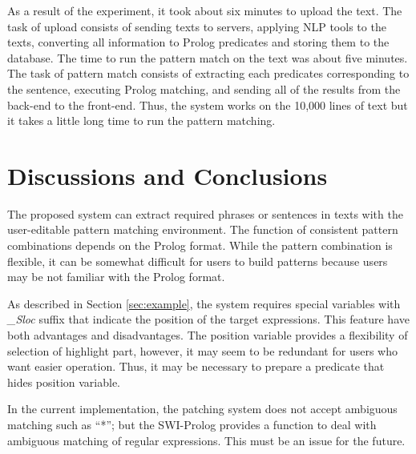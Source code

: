 \documentclass[conference]{IEEEtran}
\begin{document}
As a result of the experiment, it took about six minutes to upload the text.
The task of upload consists of sending texts to servers, applying NLP tools
to the texts, converting all information to Prolog predicates and storing them
to the database. 
The time to run the pattern match on the text was about five minutes.
The task of pattern match consists of extracting each predicates corresponding to the sentence,
executing Prolog matching, and sending all of the results from the back-end to the front-end. 
Thus, the system works on the 10,000 lines of text but it takes a little long time to run
the pattern matching. 

\section{Discussions and Conclusions}
The proposed system can extract required phrases or sentences in texts with the user-editable
pattern matching environment. The function of consistent pattern combinations depends on the Prolog format.
While the pattern combination is flexible, it can be somewhat difficult for users to build patterns
because users may be not familiar with the Prolog format.

As described in Section \ref{sec:example},
the system requires special variables with {\it \_Sloc} suffix that indicate the position of the
target expressions. This feature have both advantages and disadvantages. The position variable
provides a flexibility of selection of highlight part, however, it may seem to be redundant for
users who want easier operation. Thus, it may be necessary to prepare a predicate that hides
position variable. 

In the current implementation, the patching system does not accept ambiguous matching such as ``*'';
but the SWI-Prolog provides a function to deal with ambiguous matching of regular expressions. 
This must be an issue for the future.










\end{document}
